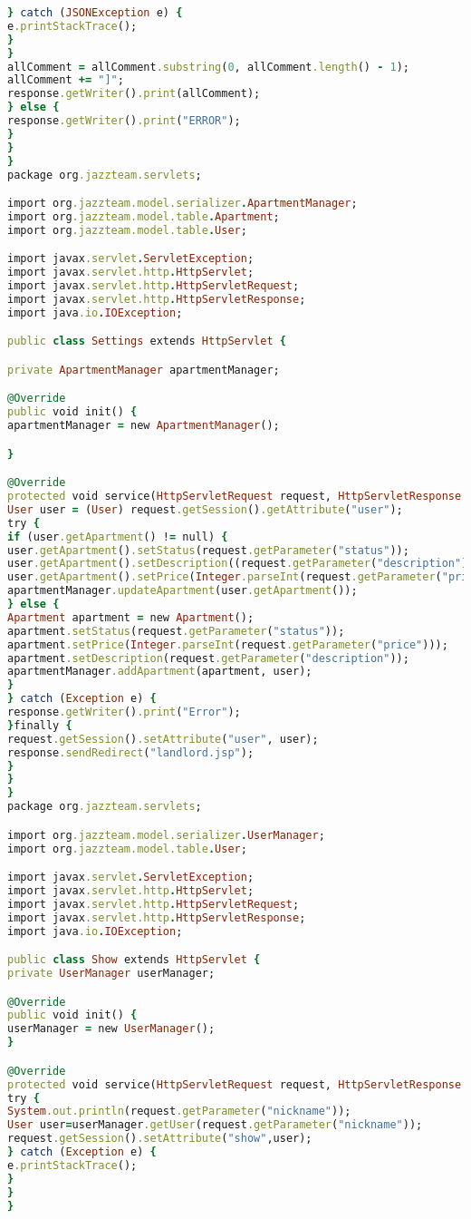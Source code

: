 \begin{lstlisting}[language=Ruby, style=rubystyle]
} catch (JSONException e) {
e.printStackTrace();
}
}
allComment = allComment.substring(0, allComment.length() - 1);
allComment += "]";
response.getWriter().print(allComment);
} else {
response.getWriter().print("ERROR");
}
}
}
package org.jazzteam.servlets;

import org.jazzteam.model.serializer.ApartmentManager;
import org.jazzteam.model.table.Apartment;
import org.jazzteam.model.table.User;

import javax.servlet.ServletException;
import javax.servlet.http.HttpServlet;
import javax.servlet.http.HttpServletRequest;
import javax.servlet.http.HttpServletResponse;
import java.io.IOException;

public class Settings extends HttpServlet {

private ApartmentManager apartmentManager;

@Override
public void init() {
apartmentManager = new ApartmentManager();

}

@Override
protected void service(HttpServletRequest request, HttpServletResponse response) throws ServletException, IOException {
User user = (User) request.getSession().getAttribute("user");
try {
if (user.getApartment() != null) {
user.getApartment().setStatus(request.getParameter("status"));
user.getApartment().setDescription((request.getParameter("description")));
user.getApartment().setPrice(Integer.parseInt(request.getParameter("price")));
apartmentManager.updateApartment(user.getApartment());
} else {
Apartment apartment = new Apartment();
apartment.setStatus(request.getParameter("status"));
apartment.setPrice(Integer.parseInt(request.getParameter("price")));
apartment.setDescription(request.getParameter("description"));
apartmentManager.addApartment(apartment, user);
}
} catch (Exception e) {
response.getWriter().print("Error");
}finally {
request.getSession().setAttribute("user", user);
response.sendRedirect("landlord.jsp");
}
}
}
package org.jazzteam.servlets;

import org.jazzteam.model.serializer.UserManager;
import org.jazzteam.model.table.User;

import javax.servlet.ServletException;
import javax.servlet.http.HttpServlet;
import javax.servlet.http.HttpServletRequest;
import javax.servlet.http.HttpServletResponse;
import java.io.IOException;

public class Show extends HttpServlet {
private UserManager userManager;

@Override
public void init() {
userManager = new UserManager();
}

@Override
protected void service(HttpServletRequest request, HttpServletResponse response) throws ServletException, IOException {
try {
System.out.println(request.getParameter("nickname"));
User user=userManager.getUser(request.getParameter("nickname"));
request.getSession().setAttribute("show",user);
} catch (Exception e) {
e.printStackTrace();
}
}
}



  \end{lstlisting}


